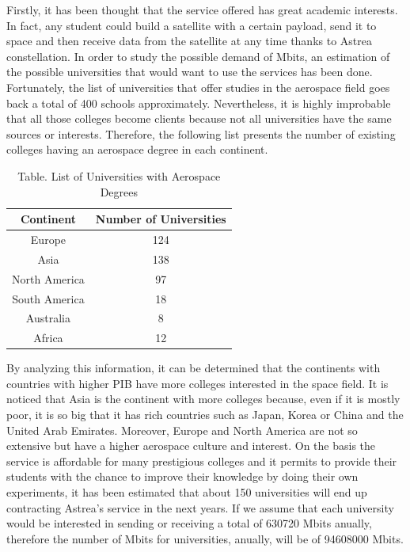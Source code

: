 Firstly, it has been thought that the service offered has great academic interests. In fact, any student could build a satellite with a certain payload, send it to space and then receive data from the satellite at any time thanks to Astrea constellation. 
\newline
\newline
In order to study the possible demand of Mbits, an estimation of the possible universities that would want to use the services has been done. Fortunately, the list of universities that offer studies in the aerospace field goes back a total of 400 schools approximately. Nevertheless, it is highly improbable that all those colleges become clients because not all universities have the same sources or interests. Therefore, the following list presents the number of existing colleges having an aerospace degree in each continent.

	\begin{table}[!h]
	\begin{center}
	\begin{tabular}{|c|c|}
	\bf{Continent} & \bf{Number of Universities}\\
	\hline 
	Europe & 124\\
	\hline 
	Asia & 138\\
	\hline 
	North America &  97\\
	\hline
	 South America & 18\\
	\hline 
	Australia & 8\\
	\hline 
	Africa & 12\\
	\end{tabular}
	\end{center}
	\caption{Table. List of Universities with Aerospace Degrees}
	\end{table} 	

By analyzing this information, it can be determined that the continents with countries with higher PIB have more colleges interested in the space field. It is noticed that Asia is the continent with more colleges because, even if it is mostly poor, it is so big that it has rich countries such as Japan, Korea or China and the United Arab Emirates. Moreover, Europe and North America are not so extensive but have a higher aerospace culture and interest. 
\newline
\newline
On the basis the service is affordable for many prestigious colleges and it permits to provide their students with the chance to improve their knowledge by doing their own experiments, it has been estimated that about 150 universities will end up contracting Astrea's service in the next years. If we assume that each university would be interested in sending or receiving a total of 630720 Mbits anually, therefore the number of Mbits for universities, anually, will be of 94608000 Mbits.

